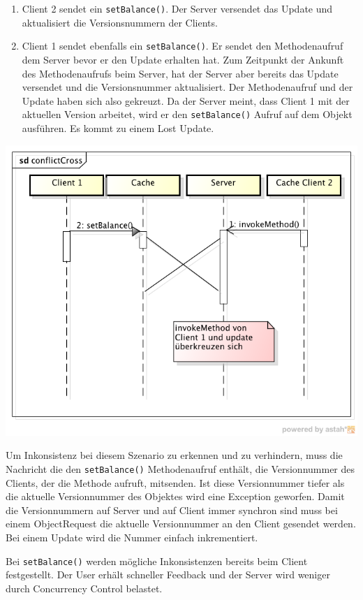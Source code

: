 \begin{enumerate}
\item Client 2 sendet ein \verb|setBalance()|. Der Server versendet das Update und aktualisiert die Versionsnummern der Clients.
\item Client 1 sendet ebenfalls ein \verb|setBalance()|. Er sendet den Methodenaufruf dem Server bevor er den Update erhalten hat. Zum Zeitpunkt der Ankunft des Methodenaufrufs beim Server, hat der Server aber bereits das Update versendet und die Versionsnummer aktualisiert. Der Methodenaufruf und der Update haben sich also gekreuzt. Da der Server meint, dass Client 1 mit der aktuellen Version arbeitet, wird er den \verb|setBalance()| Aufruf auf dem Objekt ausführen. Es kommt zu einem Lost Update.
\end{enumerate}

\includegraphics[scale=0.3]{images_objectcaching/conflictCross}

Um Inkonsistenz bei diesem Szenario zu erkennen und zu verhindern, muss die Nachricht die den \verb|setBalance()| Methodenaufruf enthält, die Versionnummer des Clients, der die Methode aufruft, mitsenden. Ist diese Versionnummer tiefer als die aktuelle Versionnummer des Objektes wird eine Exception geworfen. Damit die Versionnummern auf Server und auf Client immer synchron sind muss bei einem ObjectRequest die aktuelle Versionnummer an den Client gesendet werden. Bei einem Update wird die Nummer einfach inkrementiert.


Bei \verb+setBalance()+ werden mögliche Inkonsistenzen bereits beim Client festgestellt. Der User erhält schneller Feedback und der Server wird weniger durch Concurrency Control belastet.

